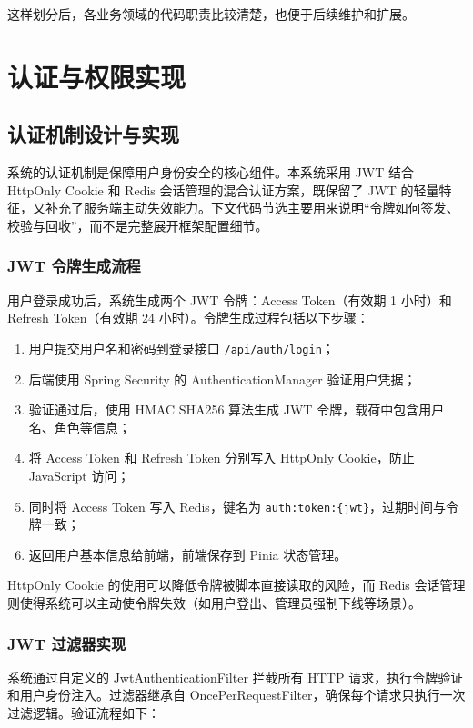 这样划分后，各业务领域的代码职责比较清楚，也便于后续维护和扩展。

\section{认证与权限实现}

\subsection{认证机制设计与实现}

系统的认证机制是保障用户身份安全的核心组件。本系统采用 JWT 结合 HttpOnly Cookie 和 Redis 会话管理的混合认证方案，既保留了 JWT 的轻量特征，又补充了服务端主动失效能力。下文代码节选主要用来说明“令牌如何签发、校验与回收”，而不是完整展开框架配置细节。

\subsubsection{JWT 令牌生成流程}

用户登录成功后，系统生成两个 JWT 令牌：Access Token（有效期 1 小时）和 Refresh Token（有效期 24 小时）。令牌生成过程包括以下步骤：

\begin{enumerate}
  \item 用户提交用户名和密码到登录接口 \texttt{/api/auth/login}；
  \item 后端使用 Spring Security 的 AuthenticationManager 验证用户凭据；
  \item 验证通过后，使用 HMAC SHA256 算法生成 JWT 令牌，载荷中包含用户名、角色等信息；
  \item 将 Access Token 和 Refresh Token 分别写入 HttpOnly Cookie，防止 JavaScript 访问；
  \item 同时将 Access Token 写入 Redis，键名为 \texttt{auth:token:\{jwt\}}，过期时间与令牌一致；
  \item 返回用户基本信息给前端，前端保存到 Pinia 状态管理。
\end{enumerate}

HttpOnly Cookie 的使用可以降低令牌被脚本直接读取的风险，而 Redis 会话管理则使得系统可以主动使令牌失效（如用户登出、管理员强制下线等场景）。

\subsubsection{JWT 过滤器实现}

系统通过自定义的 JwtAuthenticationFilter 拦截所有 HTTP 请求，执行令牌验证和用户身份注入。过滤器继承自 OncePerRequestFilter，确保每个请求只执行一次过滤逻辑。验证流程如下：

